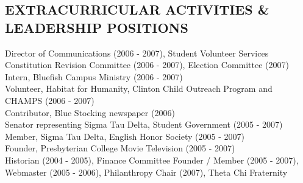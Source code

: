 \documentclass{res}
\begin{document}
\begin{resume}
 
\section{EXTRACURRICULAR ACTIVITIES \& LEADERSHIP POSITIONS}          
    Director of Communications (2006 - 2007), Student Volunteer Services\\
    Constitution Revision Committee (2006 - 2007), Election Committee (2007)\\
    Intern, Bluefish Campus Ministry (2006 - 2007)\\
    Volunteer, Habitat for Humanity, Clinton Child Outreach Program and CHAMPS (2006 - 2007)\\
    Contributor, Blue Stocking newspaper (2006)\\
    Senator representing Sigma Tau Delta, Student Government (2005 - 2007)\\
    Member, Sigma Tau Delta, English Honor Society (2005 - 2007)\\
    Founder, Presbyterian College Movie Television (2005 - 2007)\\
    Historian (2004 - 2005), Finance Committee Founder / Member (2005 - 2007), Webmaster (2005 - 2006), Philanthropy Chair (2007), Theta Chi Fraternity
         
 
\end{resume}
\end{document}
